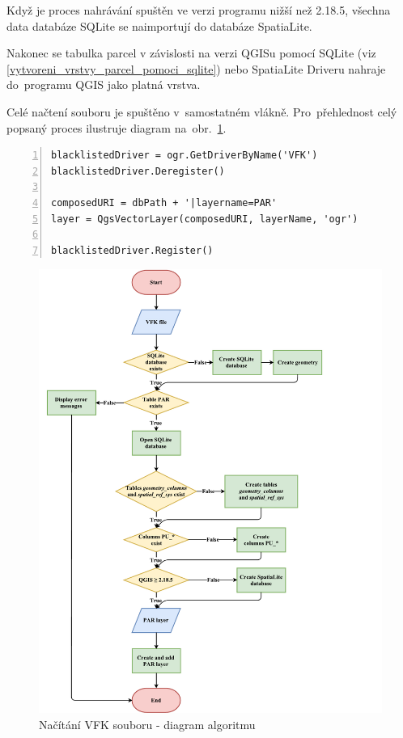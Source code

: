 Když je proces nahrávání spuštěn ve verzi programu nižší než 2.18.5, všechna data databáze SQLite se naimportují do databáze SpatiaLite.

Nakonec se tabulka parcel v závislosti na verzi QGISu pomocí SQLite (viz \ref{vytvoreni_vrstvy_parcel_pomoci_sqlite}) nebo SpatiaLite Driveru nahraje do~programu QGIS jako platná vrstva.

Celé načtení  souboru je spuštěno v~samostatném vlákně. Pro~přehlednost celý popsaný proces ilustruje diagram na~obr.~\ref{fig:diagram_nacitani_vfk}.

{\scriptsize
\begin{lstlisting}[style=python, caption={Vytvoření QGIS vrstvy parcel pomocí SQLite Driveru}, captionpos=b, label=vytvoreni_vrstvy_parcel_pomoci_sqlite, backgroundcolor = \color{light-gray},  numbers=left]
blacklistedDriver = ogr.GetDriverByName('VFK')
blacklistedDriver.Deregister()

composedURI = dbPath + '|layername=PAR'
layer = QgsVectorLayer(composedURI, layerName, 'ogr')
	
blacklistedDriver.Register()
\end{lstlisting}}

	\begin{figure}[H]
		\centering
		\includegraphics[width=1.2\textwidth]{./pictures/nacitani_vfk_souboru.pdf}
		\caption[Načítání VFK souboru - diagram algoritmu]{Načítání VFK souboru - diagram algoritmu}
		\label{fig:diagram_nacitani_vfk}
 	\end{figure}

